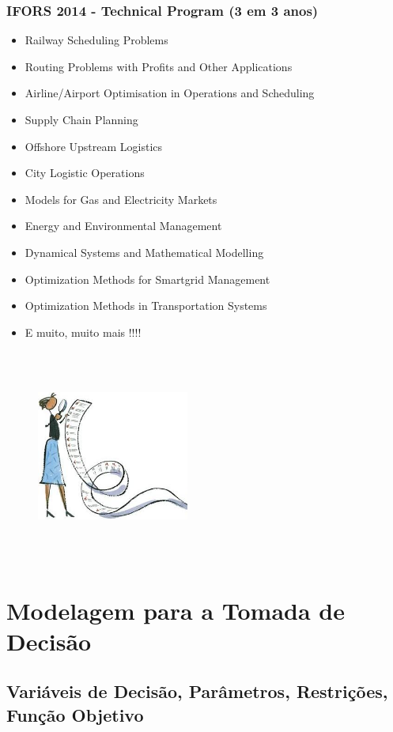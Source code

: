 \documentclass{beamer}
\begin{document}
\begin{frame}
	\frametitle{IFORS 2014 - Technical Program (3 em 3 anos)}
	\centering
	{
	\begin{itemize}
		\item Railway Scheduling Problems
		\item Routing Problems with Profits and Other Applications
		\item Airline/Airport Optimisation in Operations and Scheduling
		\item Supply Chain Planning
		\item Offshore Upstream Logistics
		\item City Logistic Operations
		\item Models for Gas and Electricity Markets
		\item Energy and Environmental Management
		\item Dynamical Systems and Mathematical Modelling
		\item Optimization Methods for Smartgrid Management
		\item Optimization Methods in Transportation Systems
		\item E muito, muito mais !!!!
	\end{itemize}
	}
	{
	\begin{figure}
		\includegraphics[width=5cm,height=7cm]{lista.jpg}
	\end{figure}
	}
\end{frame}

\section{Modelagem para a Tomada de Decisão}
\subsection{Variáveis de Decisão, Parâmetros, Restrições, Função Objetivo}
\end{document}
